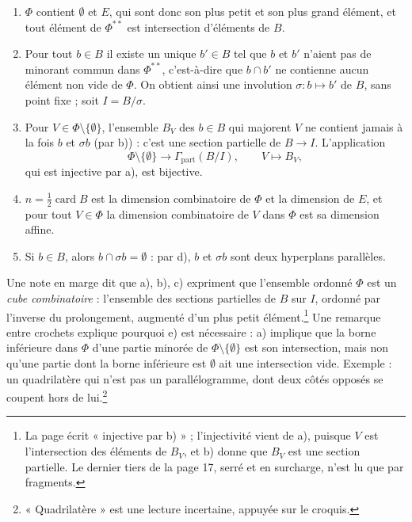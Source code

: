 \documentclass[11pt,a4paper]{article}
\begin{document}
\begin{enumerate}
\item[a)] $\Phi$ contient $\emptyset$ et $E$, qui sont donc son plus petit et son
plus grand élément, et tout élément de $\Phi^{**}$ est intersection d'éléments
de $B$.
\item[b)] Pour tout $b \in B$ il existe un unique $b' \in B$ tel que $b$ et $b'$
n'aient pas de minorant commun dans $\Phi^{**}$, c'est-à-dire que $b \cap b'$
ne contienne aucun élément non vide de $\Phi$. On obtient ainsi une involution
$\sigma : b \mapsto b'$ de $B$, sans point fixe ; soit $I = B/\sigma$.
\item[c)] Pour $V \in \Phi \setminus \{\emptyset\}$, l'ensemble $B_{V}$ des
$b \in B$ qui majorent $V$ ne contient jamais à la fois $b$ et $\sigma b$ (par
b)) : c'est une section partielle de $B \to I$. L'application
\[
  \Phi \setminus \{\emptyset\} \longrightarrow \Gamma_{\mathrm{part}}(B/I),
  \qquad V \longmapsto B_{V},
\]
qui est injective par a), est bijective.
\item[d)] $n = \frac{1}{2}\operatorname{card} B$ est la dimension combinatoire de
$\Phi$ et la dimension de $E$, et pour tout $V \in \Phi$ la dimension
combinatoire de $V$ dans $\Phi$ est sa dimension affine.
\item[e)] Si $b \in B$, alors $b \cap \sigma b = \emptyset$ : par d), $b$ et
$\sigma b$ sont deux hyperplans parallèles.
\end{enumerate}

Une note en marge dit que a), b), c) expriment que l'ensemble ordonné $\Phi$ est
un \emph{cube combinatoire} : l'ensemble des sections partielles de $B$ sur $I$,
ordonné par l'inverse du prolongement, augmenté d'un plus petit
élément.\footnote{La page écrit « injective par b) » ; l'injectivité vient de
a), puisque $V$ est l'intersection des éléments de $B_{V}$, et b) donne que
$B_{V}$ est une section partielle. Le dernier tiers de la page 17, serré et en
surcharge, n'est lu que par fragments.} Une remarque entre crochets explique
pourquoi e) est nécessaire : a) implique que la borne inférieure dans $\Phi$
d'une partie minorée de $\Phi \setminus \{\emptyset\}$ est son intersection,
mais non qu'une partie dont la borne inférieure est $\emptyset$ ait une
intersection vide. Exemple : un quadrilatère qui n'est pas un parallélogramme,
dont deux côtés opposés se coupent hors de lui.\footnote{« Quadrilatère » est
une lecture incertaine, appuyée sur le croquis.}
\end{document}

